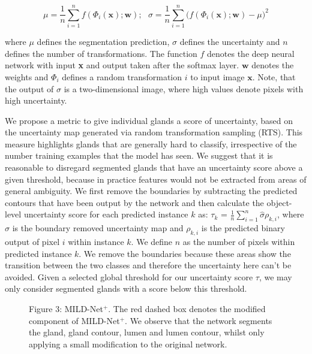 \documentclass[3p]{elsarticle}
\begin{document}
\begin{equation}
\mu= \frac{1}{n}\sum_{i=1}^{n}{f(\Phi_i(\textbf{x});\mathbold{w})};~~~\sigma = \frac{1}{n}\sum_{i=1}^{n}{(f(\Phi_i(\textbf{x});\mathbold{w})}-\mu)^2
\end{equation}

\noindent where $\mu$ defines the segmentation prediction, $\sigma$ defines the uncertainty and $n$ defines the number of transformations. The function $f$ denotes the deep neural network with input \textbf{x} and output taken after the softmax layer. $\mathbold{w}$ denotes the weights and $\Phi_i$ defines a random transformation $i$ to input image $\textbf{x}$. Note, that the output of $\sigma$ is a two-dimensional image, where high values denote pixels with high uncertainty. 

We propose a metric to give individual glands a score of uncertainty, based on the uncertainty map generated via random transformation sampling (RTS). This measure highlights glands that are generally hard to classify, irrespective of the number training examples that the model has seen. We suggest that it is reasonable to disregard segmented glands that have an uncertainty score above a given threshold, because in practice features would not be extracted from areas of general ambiguity. We first remove the boundaries by subtracting the predicted contours that have been output by the network and then calculate the object-level uncertainty score for each predicted instance $k$ as: $\tau_{k}$ = $\frac{1}{n}\sum_{i=1}^{n} \hat{\sigma}\rho_{k,i} $, where $\hat{\sigma}$ is the boundary removed uncertainty map and $\rho_{k,i}$ is the predicted binary output of pixel $i$ within instance $k$. We define $n$ as the number of pixels within predicted instance $k$. We remove the boundaries because these areas show the transition between the two classes and therefore the uncertainty here can't be avoided. Given a selected global threshold for our uncertainty score $\tau$, we may only consider segmented glands with a score below this threshold. 

\begin{figure}[!t]
\centering
\captionsetup[subfigure]{labelformat=empty}
\caption*{Figure 3: MILD-Net$^+$. The red dashed box denotes the modified component of MILD-Net$^+$. We observe that the network segments the gland, gland contour, lumen and lumen contour, whilst only applying a small modification to the original network.}
\label{fig:detection}
\end{figure}
\end{document}

